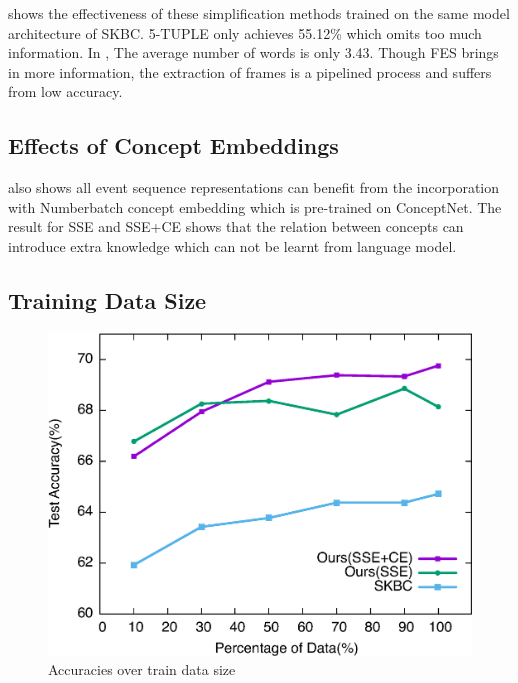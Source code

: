  shows the effectiveness of these simplification methods trained 
on the same model architecture of SKBC. 5-TUPLE only 
achieves 55.12\% which omits too much information. In , 
The average number of words is only 3.43. Though FES brings in more information, 
the extraction of  frames is a pipelined process and suffers from low accuracy.
\subsection{Effects of Concept Embeddings}
\label{sec:ce}
 also shows all event sequence representations can benefit from 
the incorporation with Numberbatch concept embedding which is pre-trained on ConceptNet. 
The result for SSE and SSE+CE shows that the relation between concepts can introduce extra 
knowledge which can not 
be learnt from language model.

\subsection{Training Data Size}
\label{sec:datasize}

\begin{figure}[th!]
\centering\includegraphics[width=0.7\columnwidth]{pictures/trend}
\caption{Accuracies over train data size}\label{fig:trend}
\end{figure}

